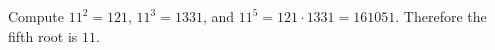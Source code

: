 Compute $11^2=121$, $11^3=1331$, and $11^5=121\cdot1331=161051$. Therefore the fifth root is $\boxed{11}$.
